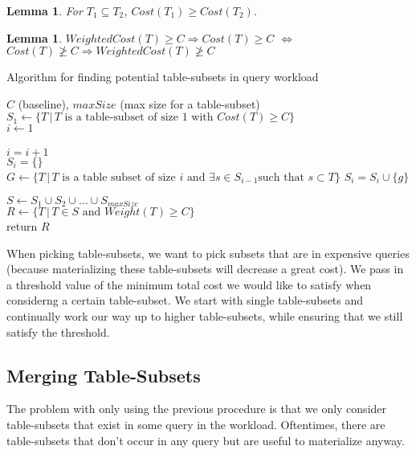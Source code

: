 \documentclass[10pt]{article}
\newtheorem{lemma}[theorem]{Lemma}
\begin{document}
\begin{lemma}
For $T_1 \subseteq T_2$, $Cost(T_1) \ge Cost(T_2)$.
\end{lemma}

\begin{lemma}
$WeightedCost(T) \ge C \Rightarrow Cost(T) \ge C$ $\Leftrightarrow$ $Cost(T) \not \ge C \Rightarrow WeightedCost(T) \not \ge C$ 
\end{lemma}

\begin{algorithm}[H]
  \caption{Algorithm for finding potential table-subsets in query workload}
  \begin{algorithmic}
  	\INPUT $C$ (baseline), $maxSize$ (max size for a table-subset) \\
  	$S_1 \gets \{T \, | \, T \textrm{ is a table-subset of size $1$ with } Cost(T) \ge C\}$ \\
  	$i \gets 1$ \\
  	 \\
  		$i = i + 1$ \\
  		$S_i = \{\}$ \\
  		$G \gets \{T \, | \, T \textrm{ is a table subset of size $i$ and } \exists s \in S_{i-1} \textrm{such that } s \subset T\}$
  				$S_i = S_i \cup \{g\}$ 
  			\EndIf
  		\EndFor
  	\EndWhile
  \end{algorithmic}
  $S \gets S_1 \cup S_2 \cup \ldots \cup S_{maxSize}$ \\
  $R \gets \{T \, | \, T \in S \textrm{ and } Weight(T) \ge C\}$ \\
  return $R$
\end{algorithm}

When picking table-subsets, we want to pick subsets that are in expensive queries (because materializing these table-subsets will decrease a great cost).
We pass in a threshold value of the minimum total cost we would like to satisfy when considerng a certain table-subset.
We start with single table-subsets and continually work our way up to higher table-subsets, while ensuring that we still satisfy the threshold.

\subsection{Merging Table-Subsets}
The problem with only using the previous procedure is that we only consider table-subsets that exist in some query in the workload. Oftentimes, there are table-subsets
that don't occur in any query but are useful to materialize anyway.
\end{document}
